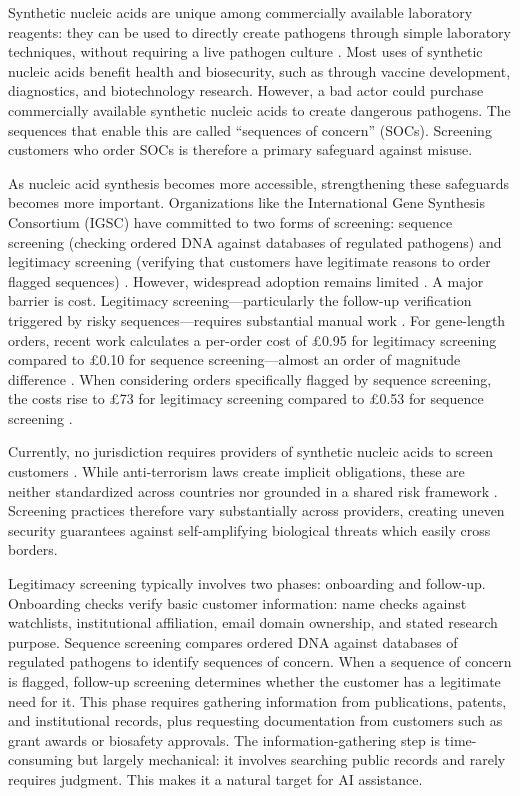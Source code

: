 \documentclass[utf8]{FrontiersinHarvard}
\begin{document}
Synthetic nucleic acids are unique among commercially available laboratory reagents: they can be used to directly create pathogens through simple laboratory techniques, without requiring a live pathogen culture \citep{Cello2002}. Most uses of synthetic nucleic acids benefit health and biosecurity, such as through vaccine development, diagnostics, and biotechnology research. However, a bad actor could purchase commercially available synthetic nucleic acids to create dangerous pathogens. The sequences that enable this are called ``sequences of concern'' (SOCs). Screening customers who order SOCs is therefore a primary safeguard against misuse.

As nucleic acid synthesis becomes more accessible, strengthening these safeguards becomes more important. Organizations like the International Gene Synthesis Consortium (IGSC) have committed to two forms of screening: sequence screening (checking ordered DNA against databases of regulated pathogens) and legitimacy screening (verifying that customers have legitimate reasons to order flagged sequences) \citep{IGSC2024}. However, widespread adoption remains limited \citep{Crawford2024}. A major barrier is cost. Legitimacy screening---particularly the follow-up verification triggered by risky sequences---requires substantial manual work \citep{CarterFriedman2015}. For gene-length orders, recent work calculates a per-order cost of \pounds0.95 for legitimacy screening compared to \pounds0.10 for sequence screening---almost an order of magnitude difference \citep{Fady2025annexes}. When considering orders specifically flagged by sequence screening, the costs rise to \pounds73 for legitimacy screening compared to \pounds0.53 for sequence screening \citep{Fady2025costmodel}.

Currently, no jurisdiction requires providers of synthetic nucleic acids to screen customers \citep{Wheeler2024}. While anti-terrorism laws create implicit obligations, these are neither standardized across countries nor grounded in a shared risk framework \citep{Wheeler2024}. Screening practices therefore vary substantially across providers, creating uneven security guarantees against self-amplifying biological threats which easily cross borders.

Legitimacy screening typically involves two phases: onboarding and follow-up. Onboarding checks verify basic customer information: name checks against watchlists, institutional affiliation, email domain ownership, and stated research purpose. Sequence screening compares ordered DNA against databases of regulated pathogens to identify sequences of concern. When a sequence of concern is flagged, follow-up screening determines whether the customer has a legitimate need for it. This phase requires gathering information from publications, patents, and institutional records, plus requesting documentation from customers such as grant awards or biosafety approvals. The information-gathering step is time-consuming but largely mechanical: it involves searching public records and rarely requires judgment. This makes it a natural target for AI assistance.
\end{document}
